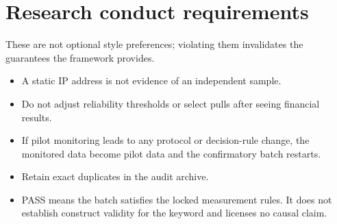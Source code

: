 \documentclass[12pt,a4paper,oneside]{article}
\begin{document}
\section{Research conduct requirements}

These are not optional style preferences; violating them invalidates the
guarantees the framework provides.

\begin{itemize}
\item A static IP address is not evidence of an independent sample.
\item Do not adjust reliability thresholds or select pulls after seeing
financial results.
\item If pilot monitoring leads to any protocol or decision-rule change, the
monitored data become pilot data and the confirmatory batch restarts.
\item Retain exact duplicates in the audit archive.
\item PASS means the batch satisfies the locked measurement rules. It does not
establish construct validity for the keyword and licenses no causal claim.
\end{itemize}
\end{document}
